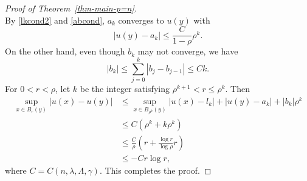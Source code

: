 \documentclass[11pt]{amsart}
\theoremstyle{plain}
\theoremstyle{definition}
\numberwithin{equation}{section}
\begin{document}
\begin{proof}[Proof of Theorem~\ref{thm-main-p=n}]
\begin{equation}
\end{equation}
By \eqref{lkcond2} and \eqref{abcond}, $a_k$ converges to $u(y)$ with
\begin{equation*}
    |u(y)-a_k| \leq \frac{C}{1-\rho}\rho^k.
\end{equation*}
On the other hand, even though $b_k$ may not converge, we have
\begin{equation*}
    |b_k| \leq \sum_{j=0}^k|b_j-b_{j-1}| \leq Ck.
\end{equation*}
For $0<r<\rho$, let $k$ be the integer satisfying $\rho^{k+1} < r \leq \rho^k$.
Then
\begin{equation*}
    \begin{aligned}
         \sup_{x\in B_r(y)}|u(x)-u(y)| &\leq \sup_{x\in B_{\rho^k}(y)}|u(x)-l_k| + |u(y)-a_k| + |b_k|\rho^k \\
    &\leq C(\rho^k+k\rho^k) \\
    &\leq \frac{C}{\rho}\left(r+\frac{\log r}{\log \rho} r\right) \\
    &\leq -Cr\log r,
    \end{aligned}
\end{equation*}
where $C=C(n, \lambda, \Lambda, \gamma)$. This completes the proof. 
\end{proof}





\end{document}

